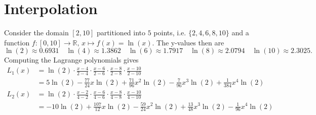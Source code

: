 \chapter{Interpolation}

\begin{example}
    Consider the domain \([2, 10]\) partitioned into \(5\) points, i.e. \(\{2, 4, 6, 8, 10\}\) and a function \(f: [0, 10] \rightarrow \mathbb{R}, \, x \mapsto f(x) = \ln(x)\). The y-values then are
    \begin{equation}
        \ln(2) \approx 0.6931 \quad \ln(4) \approx 1.3862 \quad \ln(6) \approx 1.7917 \quad \ln(8) \approx 2.0794 \quad \ln(10) \approx 2.3025 \text{.}
    \end{equation}
    Computing the Lagrange polynomials gives
    \begin{align}
        L_1 (x) &= \ln(2) \cdot \frac{x - 4}{2 - 4} \cdot \frac{x - 6}{2 - 6} \cdot \frac{x - 8}{2 - 8} \cdot \frac{x - 10}{2 - 10} \\
        &= 5 \ln(2) - \frac{77}{24} x \ln(2) + \frac{71}{96} x^2 \ln(2) - \frac{7}{96} x^3 \ln(2) + \frac{1}{384} x^4 \ln(2) \\
        L_2 (x) &= \ln(2) \cdot \frac{x - 2}{4 - 2} \cdot \frac{x - 6}{4 - 6} \cdot \frac{x - 8}{4 - 8} \cdot \frac{x - 10}{4 - 10} \\
        &= -10 \ln(2) + \frac{107}{12} x \ln(2) - \frac{59}{24} x^2 \ln(2) + \frac{13}{48} x^3 \ln(2) - \frac{1}{96} x^4 \ln(2)
    \end{align}
\end{example}